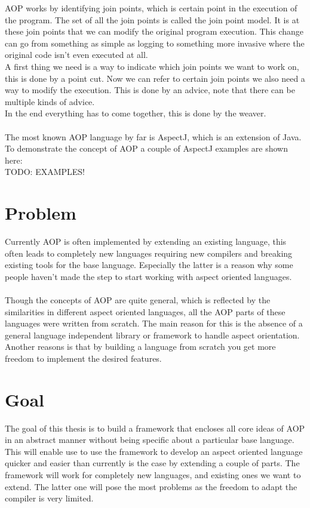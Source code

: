 \documentclass[a4paper]{report}
\begin{document}
AOP works by identifying join points, which is certain point in the execution of the program. The set of all the join points is called the join point model. It is at these join points that we can modify the original program execution. This change can go from something as simple as logging to something more invasive where the original code isn't even executed at all.\\
A first thing we need is a way to indicate which join points we want to work on, this is done by a point cut. Now we can refer to certain join points we also need a way to modify the execution. This is done by an advice, note that there can be multiple kinds of advice.\\
In the end everything has to come together, this is done by the weaver.\\
\\
The most known AOP language by far is AspectJ, which is an extension of Java. To demonstrate the concept of AOP a couple of AspectJ examples are shown here:\\
TODO: EXAMPLES!\\

\section{Problem}
Currently AOP is often implemented by extending an existing language, this often leads to completely new languages requiring new compilers and  breaking existing tools for the base language. Especially the latter is a reason why some people haven't made the step to start working with aspect oriented languages.\\
\\
Though the concepts of AOP are quite general, which is reflected by the similarities in different aspect oriented languages, all the AOP parts of these languages were written from scratch. The main reason for this is the absence of a general language independent library or framework to handle aspect orientation. Another reasons is that by building a language from scratch you get more freedom to implement the desired features.

\section{Goal}
The goal of this thesis is to build a framework that encloses all core ideas of AOP in an abstract manner without being specific about a particular base language. This will enable use to use the framework to develop an aspect oriented language quicker and easier than currently is the case by extending a couple of parts. The framework will work for completely new languages, and existing ones we want to extend. The latter one will pose the most problems as the freedom to adapt the compiler is very limited.
\end{document}
